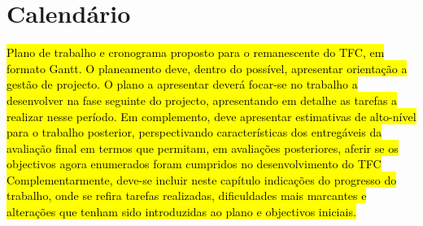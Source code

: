 \chapter{Calendário}

\hl{Plano de trabalho e cronograma proposto para o remanescente do TFC, em formato Gantt. O planeamento deve, dentro do possível, apresentar orientação a gestão de projecto. 
O plano a apresentar deverá focar-se no trabalho a desenvolver na fase seguinte do projecto, apresentando em detalhe as tarefas a realizar nesse período. Em complemento, deve apresentar estimativas de alto-nível para o trabalho posterior, perspectivando características dos entregáveis da avaliação final em termos que permitam, em avaliações posteriores, aferir se os objectivos agora enumerados foram cumpridos no desenvolvimento do TFC 
Complementarmente, deve-se incluir neste capítulo indicações do progresso do trabalho, onde se refira tarefas realizadas, dificuldades mais marcantes e alterações que tenham sido introduzidas ao plano e objectivos iniciais.}

